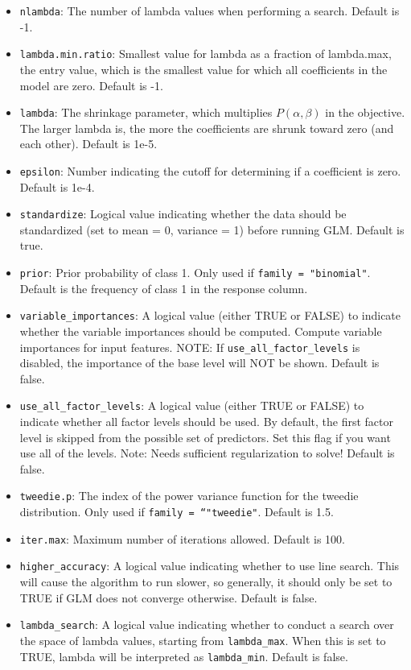 \documentclass[11pt]{article}
\begin{document}
\begin{itemize}
\item \texttt{nlambda}: The number of lambda values when performing a search. Default is -1.
\item \texttt{lambda.min.ratio}: Smallest value for lambda as a fraction of lambda.max, the entry value, which is the smallest value for which all coefficients in the model are zero. Default is -1.
\item \texttt{lambda}: The shrinkage parameter, which multiplies $P(\alpha,\beta)$ in the objective. The larger lambda is, the more the coefficients are shrunk toward zero (and each other). Default is 1e-5.
\item \texttt{epsilon}: Number indicating the cutoff for determining if a coefficient is zero. Default is 1e-4.
\item \texttt{standardize}: Logical value indicating whether the data should be standardized (set to mean = 0, variance = 1) before running GLM. Default is true.
\item \texttt{prior}: Prior probability of class 1. Only used if \texttt{family = "binomial"}. Default is the frequency of class 1 in the response column. 
\item \texttt{variable\_importances}: A logical value (either TRUE or FALSE) to indicate whether the variable importances should be computed.  Compute variable importances for input features. NOTE: If \texttt{use\_all\_factor\_levels} is disabled,  the importance of the base level will NOT be shown. Default is false.
\item \texttt{use\_all\_factor\_levels}: A logical value (either TRUE or FALSE) to indicate whether all factor levels should be used. By default, the first factor level is skipped from the possible set of predictors. Set this flag if you want use all of the levels. Note: Needs sufficient regularization to solve! Default is false.
\item \texttt{tweedie.p}: The index of the power variance function for the tweedie distribution. Only used if \texttt{family = “"tweedie"}. Default is 1.5.
\item \texttt{iter.max}: Maximum number of iterations allowed. Default is 100.
\item \texttt{higher\_accuracy}: A logical value indicating whether to use line search. This will cause the algorithm to run slower, so generally, it should only be set to TRUE if GLM does not converge otherwise. Default is false.
\item \texttt{lambda\_search}: A logical value indicating whether to conduct a search over the space of lambda values, starting from \texttt{lambda\_max}. When this is set to TRUE, lambda will be interpreted as \texttt{lambda\_min}. Default is false.

\end{itemize}
\end{document}
